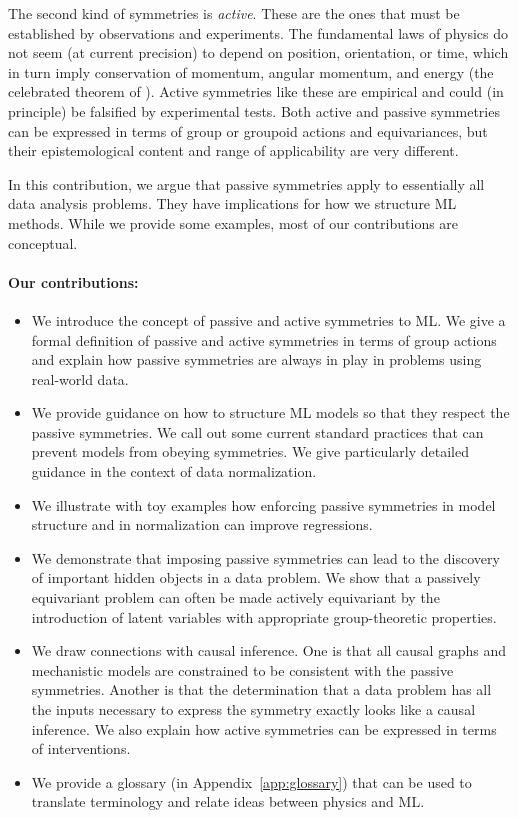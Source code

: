 \documentclass[]{article} %
\newcommand{\appref}[1]{Appendix~\ref{#1}}
\begin{document}
The second kind of symmetries is \emph{active}.
These are the ones that must be established by observations and experiments.
The fundamental laws of physics do not seem (at current precision) to depend on position, orientation, or time, which in turn imply conservation of momentum, angular momentum, and energy (the celebrated theorem of \citealt{noether}).
Active symmetries like these are empirical and could (in principle) be falsified by experimental tests.
Both active and passive symmetries can be expressed in terms of group or groupoid actions and equivariances, but their epistemological content and range of applicability are very different. 

In this contribution, we argue that passive symmetries apply to essentially all data analysis problems.
They have implications for how we structure ML methods.
While we provide some examples, most of our contributions are conceptual.

\paragraph{Our contributions:}
\begin{itemize}
\item
We introduce the concept of passive and active symmetries to ML.
We give a formal definition of passive and active symmetries in terms of group actions and explain how passive symmetries are always in play in problems using real-world data.
\item 
We provide guidance on how to structure ML models so that they respect the passive symmetries.
We call out some current standard practices that can prevent models from obeying symmetries.
We give particularly detailed guidance in the context of data normalization.
\item
We illustrate with toy examples how enforcing passive symmetries in model structure and in normalization can improve regressions. 
\item
We demonstrate that imposing passive symmetries can lead to the discovery of important hidden objects in a data problem.
We show that a passively equivariant problem can often be made actively equivariant by the introduction of latent variables with appropriate group-theoretic properties.
\item
We draw connections with causal inference.
One is that all causal graphs and mechanistic models are constrained to be consistent with the passive symmetries.
Another is that the determination that a data problem has all the inputs necessary to express the symmetry exactly looks like a causal inference. 
We also explain how active symmetries can be expressed in terms of interventions.
\item
We provide a glossary (in \appref{app:glossary}) that can be used to translate terminology and relate ideas between physics and ML. 
\end{itemize}
\end{document}
